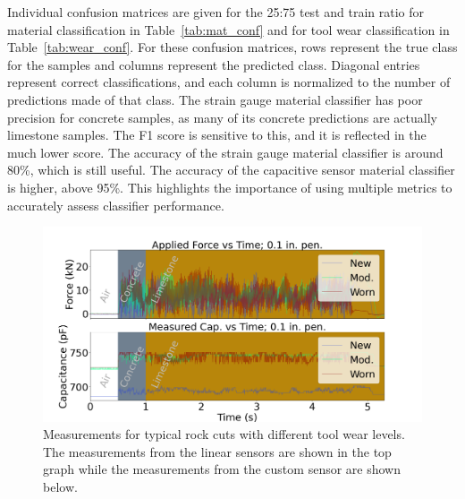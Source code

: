 Individual confusion matrices are given for the 25:75 test and train ratio for 
 material classification in Table~\ref{tab:mat_conf} 
 and for tool wear classification in Table~\ref{tab:wear_conf}.
For these confusion matrices, rows represent the true class for the samples and columns represent the 
 predicted class. Diagonal entries represent correct classifications, 
 and each column is normalized to the number of predictions made of that class.
The strain gauge material classifier has poor precision for concrete samples, 
 as many of its concrete predictions are actually limestone samples. 
The F1 score is sensitive to this, and it is reflected in the much lower score.
The accuracy of the strain gauge material classifier is around 80\%, which 
 is still useful. 
The accuracy of the capacitive sensor material classifier is higher, above 95\%.
This highlights the importance of using multiple metrics to 
 accurately assess classifier performance.

\begin{figure}[t!]
\centering
\centerline{\includegraphics[width=5.5in]{figures/p1_media/Fig7.png}}
\caption{
Measurements for typical rock cuts with different tool wear levels. The measurements from the 
linear sensors are shown in the top graph while the measurements from the custom sensor are shown below.
}
\label{fig:cutforces}
\end{figure}

